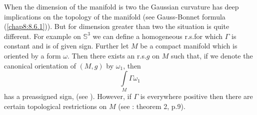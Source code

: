 \begin{remark*}
When \pageoriginale the dimension of the manifold is two the Gaussian
curvature has 
deep implications on the topology of the manifold (see Gauss-Bonnet
formula (\ref{chap8:8.6.1})). But for dimension greater than two the
situation is quite different. For example on $\mathbb{S}^{3}$ we can
define a homogeneous r.s.\@ for which $\Gamma$ is constant and is of
given sign. Further let $M$ be a compact manifold which is oriented by
a form $\omega$. Then there exists an r.s.\@ $g$ on $M$ such that, if
we denote the canonical orientation of $(M,g)$ by $\omega_{1}$, then
$$
\int\limits_{M}\Gamma\omega_{1}
$$
has a preassigned sign, (see \cite{3}). However, if $\Gamma$ is
everywhere positive then there are certain topological restrictions on
$M$ (see \cite{20}: theorem 2, p.9).
\end{remark*}
